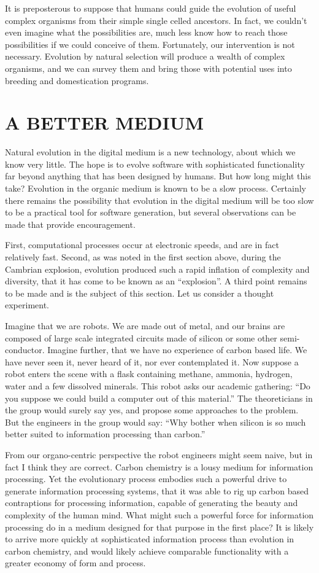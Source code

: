 It is preposterous to suppose that humans could guide the evolution
of useful complex organisms from their simple single celled ancestors.
In fact, we couldn't even imagine what the possibilities are, much less
know how to reach those possibilities if we could conceive of them.
Fortunately, our intervention is not necessary.  Evolution by natural
selection will produce a wealth of complex organisms, and we can survey
them and bring those with potential uses into breeding and domestication
programs.

\section{\bf A BETTER MEDIUM}

Natural evolution in the digital medium is a new technology, about which
we know very little.  The hope is to evolve software with sophisticated
functionality far beyond anything that has been designed by humans.  But
how long might this take?  Evolution in the organic medium is known to be
a slow process.  Certainly there remains the possibility that evolution in
the digital medium will be too slow to be a practical tool for software
generation, but several observations can be made that provide encouragement.

First, computational processes occur at electronic speeds, and are in fact
relatively fast.  Second, as was noted in the first section above, during the
Cambrian explosion, evolution produced such a rapid inflation of complexity
and diversity, that it has come to be known as an ``explosion''.  A third
point remains to be made and is the subject of this section.  Let us consider
a thought experiment.

Imagine that we are robots.  We are made out of metal, and our brains are
composed of large scale integrated circuits made of silicon or some other
semi-conductor.  Imagine further, that we have no experience of carbon
based life.  We have never seen it, never heard of it, nor ever contemplated
it.  Now suppose a robot enters the scene with a flask containing methane,
ammonia, hydrogen, water and a few dissolved minerals.  This robot asks our
academic gathering: ``Do you suppose we could build a computer out of this
material.''  The theoreticians in the group would surely say yes, and propose
some approaches to the problem.  But the engineers in the group would say:
``Why bother when silicon is so much better suited to information processing
than carbon.''

From our organo-centric perspective the robot engineers might seem naive,
but in fact I think they are correct.  Carbon chemistry is a lousy medium
for information processing.  Yet the evolutionary process embodies such a
powerful drive to generate information processing systems, that it was able
to rig up carbon based contraptions for processing information, capable of
generating the beauty and complexity of the human mind.  What might such
a powerful force for information processing do in a medium designed for
that purpose in the first place?  It is likely to arrive more quickly
at sophisticated information process than evolution in carbon chemistry,
and would likely achieve comparable functionality with a greater economy
of form and process.

